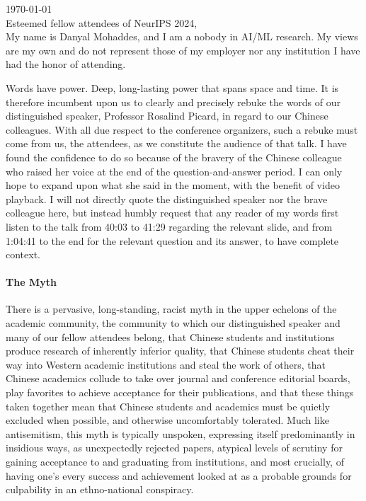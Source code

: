 \documentclass[a4paper,12pt]{article}
\begin{document}
\noindent \today\\

\noindent Esteemed fellow attendees of NeurIPS 2024,\\

\noindent My name is Danyal Mohaddes, and I am a nobody in AI/ML research. My views are my own and do not represent those of my employer nor any institution I have had the honor of attending.

Words have power. Deep, long-lasting power that spans space and time. It is therefore incumbent upon us to clearly and precisely rebuke the words of our distinguished speaker, Professor Rosalind Picard, in regard to our Chinese colleagues. With all due respect to the conference organizers, such a rebuke must come from us, the attendees, as we constitute the audience of that talk. I have found the confidence to do so because of the bravery of the Chinese colleague who raised her voice at the end of the question-and-answer period. I can only hope to expand upon what she said in the moment, with the benefit of video playback. I will not directly quote the distinguished speaker nor the brave colleague here, but instead humbly request that any reader of my words first listen to the talk from 40:03 to 41:29 regarding the relevant slide, and from 1:04:41 to the end for the relevant question and its answer, to have complete context.

\paragraph{The Myth}
There is a pervasive, long-standing, racist myth in the upper echelons of the academic community, the community to which our distinguished speaker and many of our fellow attendees belong, that Chinese students and institutions produce research of inherently inferior quality, that Chinese students cheat their way into Western academic institutions and steal the work of others, that Chinese academics collude to take over journal and conference editorial boards, play favorites to achieve acceptance for their publications, and that these things taken together mean that Chinese students and academics must be quietly excluded when possible, and otherwise uncomfortably tolerated. Much like antisemitism, this myth is typically unspoken, expressing itself predominantly in insidious ways, as unexpectedly rejected papers, atypical levels of scrutiny for gaining acceptance to and graduating from institutions, and most crucially, of having one’s every success and achievement looked at as a probable grounds for culpability in an ethno-national conspiracy.
\end{document}
